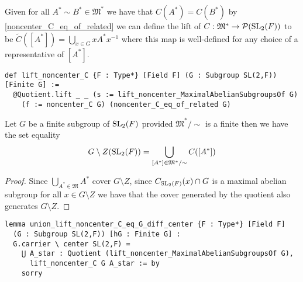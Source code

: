 \begin{definition}
\label{lift_noncenter_C}
\leanok
 Given for all $A^* \sim B^* \in \mathfrak{M}^*$ we have that $C(A^*) = C(B^*)$ by \ref{noncenter_C_eq_of_related} we can define the lift of $C : \mathfrak{M}^* \rightarrow \mathcal{P}(\operatorname{SL}_2(F))$ to be 
  $\tilde{C}([A^*]) = \bigcup_{x \in G} x A^* x^{-1}$ where this map is well-defined for any choice of a representative of $[A^*]$.
\end{definition}
\begin{footnotesize}
\begin{verbatim}
def lift_noncenter_C {F : Type*} [Field F] (G : Subgroup SL(2,F)) [Finite G] :=
  @Quotient.lift _ _ (s := lift_noncenter_MaximalAbelianSubgroupsOf G)
    (f := noncenter_C G) (noncenter_C_eq_of_related G)
\end{verbatim}
\end{footnotesize}

\begin{theorem}
\label{union_lift_noncenter_C_eq_G_diff_center}
  Let $G$ be a finite subgroup of $\operatorname{SL}_2(F)$ provided $\mathfrak{M}^* / \sim$ is a finite then we have the set equality
  \[
   G \setminus Z(\operatorname{SL}_2(F)) = \bigcup_{[A^*] \in \mathfrak{M}^* / \sim} C([A^*])
  \]
\end{theorem}
\begin{proof}
  Since $\bigcup_{A^* \in \mathfrak{M}} A^*$ cover $G \setminus Z$, since $C_{\operatorname{SL}_2(F)}(x) \cap G$ is a maximal abelian subgroup for all $x \in G \setminus Z$
  we have that the cover generated by the quotient also generates $G \setminus Z$.
\end{proof}
\begin{footnotesize}
\begin{verbatim}
lemma union_lift_noncenter_C_eq_G_diff_center {F : Type*} [Field F]
  (G : Subgroup SL(2,F)) [hG : Finite G] :
  G.carrier \ center SL(2,F) =
    ⋃ A_star : Quotient (lift_noncenter_MaximalAbelianSubgroupsOf G),
      lift_noncenter_C G A_star := by
    sorry

\end{verbatim}
\end{footnotesize}

